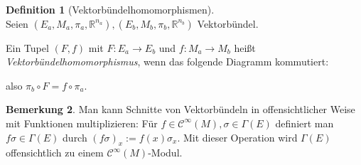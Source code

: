 \documentclass[a4paper]{scrreprt}
\numberwithin{equation}{chapter}
\newcommand{\R}{\mathbb{R}}
\newcommand{\sC}{\mathcal{C}^{\infty}}
\theoremstyle{definition}
\newtheorem{defn}{Definition}[section]
\newtheorem{bem}[defn]{Bemerkung}
\begin{document}
		\begin{defn}[Vektorbündelhomomorphismen]\hfill\\
			Seien $(E_a,M_a,\pi_a,\R^{n_a}),(E_b,M_b,\pi_b,\R^{n_b})$ Vektorbündel.
			
			Ein Tupel $(F,f)$ mit $F\colon E_a\rightarrow E_b$ und $f\colon M_a\rightarrow M_b$ heißt \emph{Vektorbündelhomomorphismus}, wenn das folgende Diagramm kommutiert:
			\begin{center}
			\end{center}
			also $\pi_b\circ F=f\circ\pi_a$.
		\end{defn}
		
		
		\begin{bem}
			Man kann Schnitte von Vektorbündeln in offensichtlicher Weise mit Funktionen multiplizieren: Für $f \in \sC(M), \sigma \in \Gamma(E)$ definiert man $f\sigma \in \Gamma(E)$ durch $(f\sigma)_x := f(x) \sigma_x$. Mit dieser Operation wird $\Gamma(E)$ offensichtlich zu einem $\sC(M)$-Modul.
		\end{bem}
\end{document}
